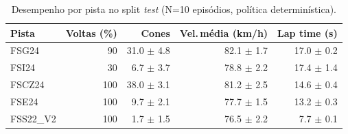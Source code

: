 \begin{table}[H]
\centering
\caption{Desempenho por pista no split \textit{test} (N=10 episódios, política determinística).}
\label{tab:per_track_test}
\begin{tabular}{lrrrr}
\toprule
\textbf{Pista} & \textbf{Voltas (\%)} & \textbf{Cones} & \textbf{Vel.\,m\'edia (km/h)} & \textbf{Lap time (s)} \\
\midrule
FSG24 & 90 & 31.0 $\pm$ 4.8 & 82.1 $\pm$ 1.7 & 17.0 $\pm$ 0.2 \\
FSI24 & 30 & 6.7 $\pm$ 3.7 & 78.8 $\pm$ 2.2 & 17.4 $\pm$ 1.4 \\
FSCZ24 & 100 & 38.0 $\pm$ 3.1 & 81.2 $\pm$ 2.5 & 14.6 $\pm$ 0.4 \\
FSE24 & 100 & 9.7 $\pm$ 2.1 & 77.7 $\pm$ 1.5 & 13.2 $\pm$ 0.3 \\
FSS22_V2 & 100 & 1.7 $\pm$ 1.5 & 76.5 $\pm$ 2.2 & 7.7 $\pm$ 0.1 \\
\bottomrule
\end{tabular}
\end{table}
